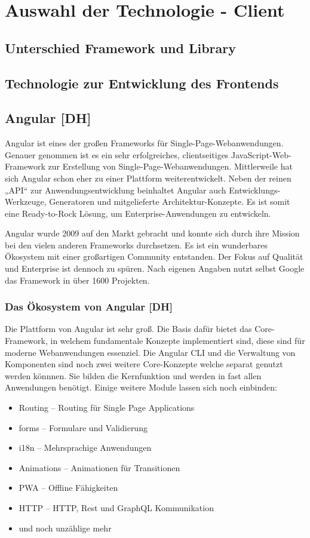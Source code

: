 \section{Auswahl der Technologie - Client}

\subsection{Unterschied Framework und Library}
\subsection{Technologie zur Entwicklung des Frontends}
\subsection{Angular [DH]}
Angular ist eines der großen Frameworks für Single-Page-Webanwendungen. Genauer genommen ist es ein sehr erfolgreiches, clientseitiges JavaScript-Web-Framework zur Erstellung von Single-Page-Webanwendungen. Mittlerweile hat sich Angular schon eher zu einer Plattform weiterentwickelt. Neben der reinen „API“ zur Anwendungsentwicklung beinhaltet Angular auch Entwicklungs-Werkzeuge, Generatoren und mitgelieferte Architektur-Konzepte. Es ist somit eine Ready-to-Rock Lösung, um Enterprise-Anwendungen zu entwickeln.

Angular wurde 2009 auf den Markt gebracht und konnte sich durch ihre Mission bei den vielen anderen Frameworks durchsetzen. Es ist ein wunderbares Ökosystem mit einer großartigen Community entstanden. Der Fokus auf Qualität und Enterprise ist dennoch zu spüren. Nach eigenen Angaben nutzt selbst Google das Framework in über 1600 Projekten.

\subsubsection{Das Ökosystem von Angular [DH]}
Die Plattform von Angular ist sehr groß. Die Basis dafür bietet das Core-Framework, in welchem fundamentale Konzepte implementiert sind, diese sind für moderne Webanwendungen essenziel. Die Angular CLI und die Verwaltung von Komponenten sind noch zwei weitere Core-Konzepte welche separat genutzt werden könnnen. Sie bilden die Kernfunktion und werden in fast allen Anwendungen benötigt. Einige weitere Module lassen sich noch einbinden:

\begin{itemize}
  \item Routing – Routing für Single Page Applications
  \item forms – Formulare und Validierung
  \item i18n – Mehrsprachige Anwendungen
  \item Animations – Animationen für Transitionen
  \item PWA – Offline Fähigkeiten
  \item HTTP – HTTP, Rest und GraphQL Kommunikation
  \item und noch unzählige mehr  
\end{itemize}
\cite{AngularBeschreibung}

